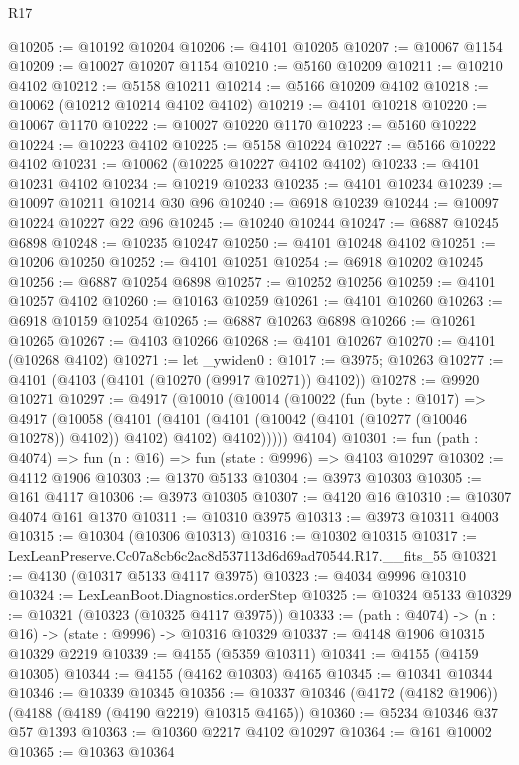 \begin{lexlean}{R17}
\begin{coremodule}
@10205 := @10192 @10204
@10206 := @4101 @10205
@10207 := @10067 @1154
@10209 := @10027 @10207 @1154
@10210 := @5160 @10209
@10211 := @10210 @4102
@10212 := @5158 @10211
@10214 := @5166 @10209 @4102
@10218 := @10062 (@10212 @10214 @4102 @4102)
@10219 := @4101 @10218
@10220 := @10067 @1170
@10222 := @10027 @10220 @1170
@10223 := @5160 @10222
@10224 := @10223 @4102
@10225 := @5158 @10224
@10227 := @5166 @10222 @4102
@10231 := @10062 (@10225 @10227 @4102 @4102)
@10233 := @4101 @10231 @4102
@10234 := @10219 @10233
@10235 := @4101 @10234
@10239 := @10097 @10211 @10214 @30 @96
@10240 := @6918 @10239
@10244 := @10097 @10224 @10227 @22 @96
@10245 := @10240 @10244
@10247 := @6887 @10245 @6898
@10248 := @10235 @10247
@10250 := @4101 @10248 @4102
@10251 := @10206 @10250
@10252 := @4101 @10251
@10254 := @6918 @10202 @10245
@10256 := @6887 @10254 @6898
@10257 := @10252 @10256
@10259 := @4101 @10257 @4102
@10260 := @10163 @10259
@10261 := @4101 @10260
@10263 := @6918 @10159 @10254
@10265 := @6887 @10263 @6898
@10266 := @10261 @10265
@10267 := @4103 @10266
@10268 := @4101 @10267
@10270 := @4101 (@10268 @4102)
@10271 := let _ywiden0 : @1017 := @3975; @10263
@10277 := @4101 (@4103 (@4101 (@10270 (@9917 @10271)) @4102))
@10278 := @9920 @10271
@10297 := @4917
    (@10010
      (@10014
        (@10022
          (fun (byte : @1017) =>
          @4917
            (@10058
              (@4101
                (@4101 (@4101 (@10042 (@4101 (@10277 (@10046 @10278)) @4102)) @4102) @4102)
                @4102)))))
      @4104)
@10301 := fun (path : @4074) => fun (n : @16) => fun (state : @9996) => @4103 @10297
@10302 := @4112 @1906
@10303 := @1370 @5133
@10304 := @3973 @10303
@10305 := @161 @4117
@10306 := @3973 @10305
@10307 := @4120 @16
@10310 := @10307 @4074 @161 @1370
@10311 := @10310 @3975
@10313 := @3973 @10311 @4003
@10315 := @10304 (@10306 @10313)
@10316 := @10302 @10315
@10317 := LexLeanPreserve.Cc07a8cb6c2ac8d537113d6d69ad70544.R17.__fits_55
@10321 := @4130 (@10317 @5133 @4117 @3975)
@10323 := @4034 @9996 @10310
@10324 := LexLeanBoot.Diagnostics.orderStep
@10325 := @10324 @5133
@10329 := @10321 (@10323 (@10325 @4117 @3975))
@10333 := (path : @4074) -> (n : @16) -> (state : @9996) -> @10316 @10329
@10337 := @4148 @1906 @10315 @10329 @2219
@10339 := @4155 (@5359 @10311)
@10341 := @4155 (@4159 @10305)
@10344 := @4155 (@4162 @10303) @4165
@10345 := @10341 @10344
@10346 := @10339 @10345
@10356 := @10337 @10346 (@4172 (@4182 @1906)) (@4188 (@4189 (@4190 @2219) @10315 @4165))
@10360 := @5234 @10346 @37 @57 @1393
@10363 := @10360 @2217 @4102 @10297
@10364 := @161 @10002
@10365 := @10363 @10364

\end{coremodule}
\end{lexlean}
